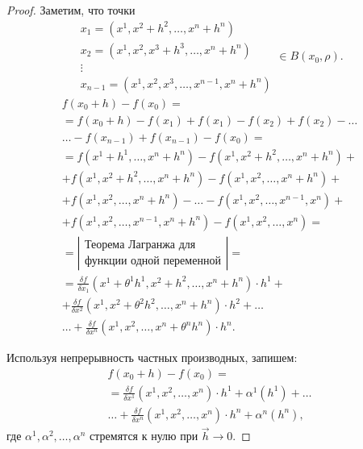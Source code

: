 \begin{proof}
    Заметим, что точки
    \[
        \begin{array}{l}
            x_1 = (x^1,x^2+h^2,\ldots,x^n+h^n)       \\
            x_2 = (x^1,x^2,x^3 + h^3,\ldots,x^n+h^n) \\
            \vdots                                   \\
            x_{n-1} = (x^1,x^2,x^3,\ldots,x^{n-1},x^n+h^n)
        \end{array} \in B(x_0,\rho).
    \]
    \begin{multline*}
        f(x_0 + h) - f(x_0) = \\
        = f(x_0 + h) - f(x_1) + f(x_1) - f(x_2) + f(x_2) - \ldots\\
        \ldots - f(x_{n-1}) + f(x_{n-1}) - f(x_0) = \\
        = f(x^1 + h^1, \ldots,  x^n + h^n) - f(x^1, x^2 + h^2,  \ldots,  x^n + h^n) + \\
        + f(x^1,  x^2 + h^2,  \ldots,  x^n + h^n) - f(x^1,  x^2,  \ldots,  x^n + h^n) + \\
        + f(x^1,  x^2,  \ldots,  x^n + h^n) - \ldots - f(x^1,  x^2,  \ldots,  x^{n-1},  x^n) + \\
        + f(x^1,  x^2,  \ldots,  x^{n-1},  x^n + h^n) - f(x^1,  x^2,  \ldots,  x^n) = \\
        = \left|\begin{array}{c}
            \text{Теорема Лагранжа для} \\
            \text{функции одной переменной}
        \end{array}\right| = \\
        = \frac{\delta f}{\delta x_1}(x^1 + \theta^1 h^1,  x^2 + h^2,  \ldots,  x^n + h^n) \cdot h^1 + \\
        + \frac{\delta f}{\delta x^2}(x^1,  x^2 + \theta^2 h^2,  \ldots,  x^n + h^n) \cdot h^2 + \ldots \\
        \ldots + \frac{\delta f}{\delta x^n}(x^1,  x^2,  \ldots,  x^n + \theta^n h^n) \cdot h^n.
    \end{multline*}

    Используя непрерывность частных производных, запишем:
    \begin{multline*}
        f(x_0 + h) - f(x_0) = \\
        = \frac{\delta f}{\delta x^1}(x^1, x^2, \ldots, x^n) \cdot h^1 + \alpha^1(h^1) + \ldots \\
        \ldots + \frac{\delta f}{\delta x^n}(x^1, x^2, \ldots, x^n) \cdot h^n + \alpha^n(h^n),
    \end{multline*}
    где $\alpha^1,\alpha^2,\ldots,\alpha^n$ стремятся к нулю при $\vec{h}\rightarrow0$.


\end{proof}

